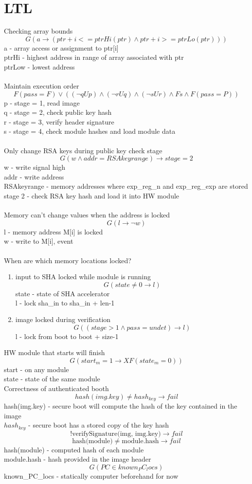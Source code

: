 \documentclass[10pt,openany]{article}
\author{Elaine Chou}
\begin{document}
\section{LTL}
Checking array bounds
\[G(a\rightarrow(ptr+i <= ptrHi(ptr) \land ptr+i >= ptrLo(ptr)))\]
a - array access or assignment to ptr[i]\\
ptrHi - highest address in range of array associated with ptr\\
ptrLow - lowest address\\\\
%
Maintain execution order
\[F(pass=F)\lor((\lnot qUp)\land(\lnot rUq)\land(\lnot sUr)\land Fs\land F(pass=P))\]
p - stage = 1, read image\\
q - stage = 2, check public key hash\\
r - stage = 3, verify header signature\\
s - stage = 4, check module hashes and load module data\\\\
%
Only change RSA keys during public key check stage
\[G(w\land addr=RSAkeyrange)\rightarrow stage=2\]
w - write signal high\\
addr - write address\\
RSAkeyrange - memory addresses where exp\_reg\_n and exp\_reg\_exp are stored\\
stage 2 - check RSA key hash and load it into HW module\\\\
%
Memory can't change values when the address is locked
\[G(l\rightarrow\lnot w)\]
l - memory address M[i] is locked\\
w - write to M[i], event\\\\
%
When are which memory locations locked?
\begin{enumerate}
\item input to SHA locked while module is running\\
  \[G(state\neq 0\rightarrow l)\]
  state - state of SHA accelerator\\
  l - lock sha\_in to sha\_in + len-1
\item image locked during verification
  \[G((stage > 1 \land pass=undet)\rightarrow l)\]
  l - lock from boot to boot + size-1
\end{enumerate}
%
HW module that starts will finish
\[G(start_m=1\rightarrow XF(state_m=0))\]
start - on any module\\
state - state of the same module\\
%
Correctness of authenticated booth
\[hash(img.key) \neq hash_{key} \rightarrow fail\]
hash(img.key) - secure boot will compute the hash of the key contained in the image\\
$hash_{key}$ - secure boot has a stored copy of the key hash\\
\[\text{!verifySignature(img, img.key)} \rightarrow fail\]
\[\text{hash(module)} \neq \text{module.hash} \rightarrow fail\]
hash(module) - computed hash of each module\\
module.hash - hash provided in the image header
\[G(PC \in known_PC_locs)\]
known\_PC\_locs - statically computer beforehand for now
\end{document}
